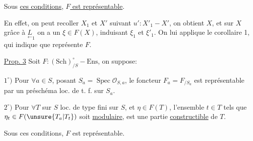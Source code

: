 Sous \uline{ces conditions}, \uline{$F$ est représentable}.

En effet, on peut recoller $X_1$ et $X'$ suivant $u':X'_1\mathbin{-}X'$, on obtient $X$, et sur $X$ grâce à $\underset{\leftarrow}{L}_1$ on a un $\xi\in F(X)$, induisant $\xi_1$ et $\xi'_1$. On lui applique le corollaire 1, qui indique que   représente $F$.


\uline{Prop. 3} Soit $F:(\mathrm{Sch})_{/S}^{\circ}\mathbin{-}\mathrm{Ens}$, on suppose: 

$1^\circ)$ Pour $\forall a\in S$, posant $S_a=\operatorname{Spec}\mathcal O_{S,a}$, le foncteur $F_a=F_{/S_a}$ est représentable par un préschéma  loc. de t. f. sur $S_a$.

$2^\circ)$ Pour $\forall T$ sur $S$ loc. de type fini sur $S$, et $\eta\in F(T)$, l'ensemble  $t\in T$ tels que $\eta_t\in F(\unsure{T_a|T_t})$ soit  \uline{modulaire}, est une partie \uline{constructible} de $T$.

Sous ces conditions, $F$ est représentable.
